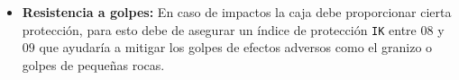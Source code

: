 \begin{itemize}
    \item \textbf{Resistencia a golpes:} En caso de impactos la caja debe proporcionar cierta protección, para esto debe de asegurar un índice de protección \texttt{IK} entre $08$ y $09$ que ayudaría a mitigar los golpes de efectos adversos como el granizo o golpes de pequeñas rocas. \cite{iecInternationalStandardIEC}

\end{itemize}